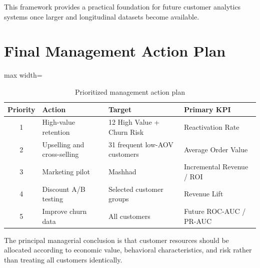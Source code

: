 \documentclass[11pt,a4paper]{article}
\begin{document}
This framework provides a practical foundation for future customer analytics systems once larger and longitudinal datasets become available.


\section{Final Management Action Plan}

\begin{table}[H]
\centering
\caption{Prioritized management action plan}
\label{tab:action_plan}
\begin{adjustbox}{max width=\textwidth}
\begin{tabular}{clll}
\toprule
\textbf{Priority} &
\textbf{Action} &
\textbf{Target} &
\textbf{Primary KPI}\\
\midrule
1 &
High-value retention &
12 High Value + Churn Risk &
Reactivation Rate\\

2 &
Upselling and cross-selling &
31 frequent low-AOV customers &
Average Order Value\\

3 &
Marketing pilot &
Mashhad &
Incremental Revenue / ROI\\

4 &
Discount A/B testing &
Selected customer groups &
Revenue Lift\\

5 &
Improve churn data &
All customers &
Future ROC-AUC / PR-AUC\\
\bottomrule
\end{tabular}
\end{adjustbox}
\end{table}

The principal managerial conclusion is that customer resources should be allocated according to economic value, behavioral characteristics, and risk rather than treating all customers identically.

\end{document}
